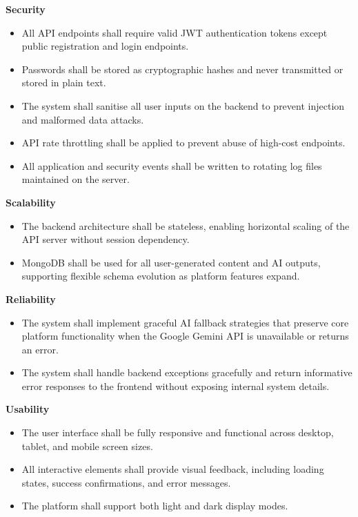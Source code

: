 \documentclass[12pt]{article}
\begin{document}
\textbf{Security}

\begin{itemize}
  \item All API endpoints shall require valid JWT authentication tokens except public registration and login endpoints.
  \item Passwords shall be stored as cryptographic hashes and never transmitted or stored in plain text.
  \item The system shall sanitise all user inputs on the backend to prevent injection and malformed data attacks.
  \item API rate throttling shall be applied to prevent abuse of high-cost endpoints.
  \item All application and security events shall be written to rotating log files maintained on the server.
\end{itemize}

\textbf{Scalability}

\begin{itemize}
  \item The backend architecture shall be stateless, enabling horizontal scaling of the API server without session dependency.
  \item MongoDB shall be used for all user-generated content and AI outputs, supporting flexible schema evolution as platform features expand.
\end{itemize}

\textbf{Reliability}

\begin{itemize}
  \item The system shall implement graceful AI fallback strategies that preserve core platform functionality when the Google Gemini API is unavailable or returns an error.
  \item The system shall handle backend exceptions gracefully and return informative error responses to the frontend without exposing internal system details.
\end{itemize}

\textbf{Usability}

\begin{itemize}
  \item The user interface shall be fully responsive and functional across desktop, tablet, and mobile screen sizes.
  \item All interactive elements shall provide visual feedback, including loading states, success confirmations, and error messages.
  \item The platform shall support both light and dark display modes.
\end{itemize}
\end{document}
